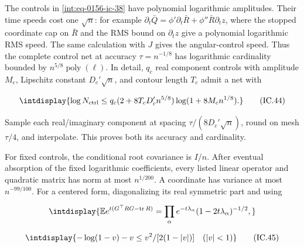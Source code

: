 
The controls in \eqref{int:eq-0156-ic-38} have polynomial logarithmic amplitudes. Their time speeds cost one \(\sqrt n\): for example \(\partial_t\bar Q=\phi'\partial_t\bar R+ \phi''\bar R\partial_tz\), where the stopped coordinate cap on \(\bar R\) and the RMS bound on \(\partial_tz\) give a polynomial logarithmic RMS speed. The same calculation with \(J\) gives the angular-control speed. Thus the complete control net at accuracy \(\tau=n^{-1/8}\) has logarithmic cardinality bounded by \(n^{5/8}\operatorname{poly}(\ell)\). In detail, \(q_c\) real component controls with amplitude \(M_c\), Lipschitz constant \(D_c'\sqrt n\), and contour length \(T_c\) admit a net with


\begingroup\renewcommand{\theHequation}{intdisplay.345}
\begin{equation}
\intdisplay{
\log N_{\rm ctrl}\le
 q_c(2+8T_cD_c'n^{5/8})\log(1+8M_cn^{1/8}).
}
\tag{IC.44}
\label{int:eq-0162-ic-44}
\end{equation}
\endgroup


Sample each real/imaginary component at spacing \(\tau/(8D_c'\sqrt n)\), round on mesh \(\tau/4\), and interpolate. This proves both its accuracy and cardinality.



For fixed controls, the conditional root covariance is \(I/n\). After eventual absorption of the fixed logarithmic coefficients, every listed linear operator and quadratic matrix has norm at most \(n^{1/200}\). A coordinate has variance at most \(n^{-99/100}\). For a centered form, diagonalizing its real symmetric part and using


\begingroup\renewcommand{\theHequation}{intdisplay.346}
\begin{equation*}
\intdisplay{
\mathbb E e^{t(G^\top RG-\operatorname{tr}R)}
   =\prod_\alpha e^{-t\lambda_\alpha}
                         (1-2t\lambda_\alpha)^{-1/2},
}
\end{equation*}
\endgroup

\begingroup\renewcommand{\theHequation}{intdisplay.347}
\begin{equation}
\intdisplay{
-\log(1-v)-v\le v^2/[2(1-|v|)]\quad(|v|<1)
}
\tag{IC.45}
\label{int:eq-0163-ic-45}
\end{equation}
\endgroup

